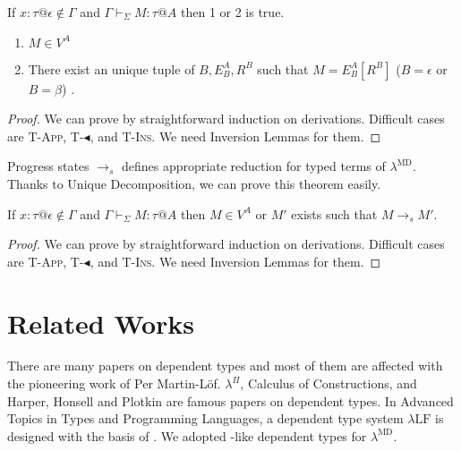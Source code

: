 \documentclass[runningheads]{llncs}
\newcommand{\LMD}{$\lambda^{\textrm{MD}}$\xspace}
\newcommand{\LLF}{$\lambda\textrm{LF}$\xspace}
\newcommand{\G}{\Gamma}
\newcommand{\V}{\vdash_\Sigma}
\newcommand{\TBL}{\blacktriangleleft}
\newcommand{\TApp}{\textsc{T-App}}
\newcommand{\TTBL}{\textsc{T-$\TBL$}}
\newcommand{\TIns}{\textsc{T-Ins}}
\begin{document}
									\begin{theorem}
										If $x:\tau @\epsilon \notin \G$ and $\G \V M : \tau @ A$ then 1 or 2 is true.
										\begin{enumerate}
											\item $ M \in V^A$
											\item There exist an unique tuple of $B, E^A_B, R^B$ such that $M = E^A_B[R^B]$ ($B = \epsilon$ or $B = \beta$) .
										\end{enumerate}
									\end{theorem}
									
									\begin{proof}
										We can prove by straightforward induction on derivations.
										Difficult cases are \TApp, \TTBL, and \TIns.
										We need Inversion Lemmas for them.
									\end{proof}
									
									Progress states $\longrightarrow_s$ defines appropriate reduction for typed terms of \LMD.
									Thanks to Unique Decomposition, we can prove this theorem easily.
									
									\begin{theorem}[Progress]
										If $x:\tau @\epsilon \notin \G$ and $\G \V M : \tau  @ A$ then
										$ M \in V^A $ or $M'$ exists such that $M \longrightarrow_s M'$.
									\end{theorem}
									
									\begin{proof}
										We can prove by straightforward induction on derivations.
										Difficult cases are \TApp, \TTBL, and \TIns.
										We need Inversion Lemmas for them.
									\end{proof}
									
									\section{Related Works}
									
									
									There are many papers on dependent types and most of them are affected with the pioneering work of Per Martin-L\"{o}f.
									$\lambda^\Pi$\cite{Meyer1986}, Calculus of Constructions\cite{coquand:inria-00076024}, 
									and Harper, Honsell and Plotkin\cite{harper1993framework} are famous papers on dependent types.
									In Advanced Topics in Types and Programming Languages\cite{attapl},
									a dependent type system \LLF is designed with the basis of \cite{harper1993framework}.
									We adopted \cite{attapl}-like dependent types for \LMD.
									
\end{document}
